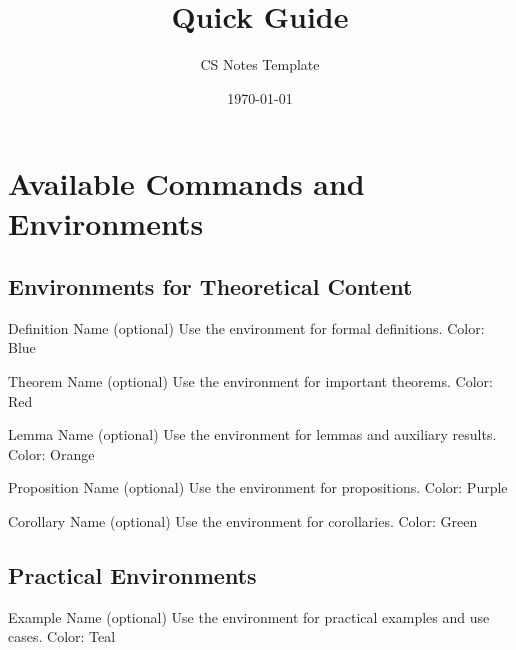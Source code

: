 \documentclass[]{csnotes}
\title{Quick Guide}
\author{CS Notes Template}
\date{\today}
\begin{document}
\maketitlepage{}
\tableofcontents
\listoftheorems
\listofexamples
\listofalgos

\newpage


\section{Available Commands and Environments}

\subsection{Environments for Theoretical Content}\label{sec:theoretical_environments}

\begin{definition}{Definition Name (optional)}
Use the  environment for formal definitions.
Color: Blue
\end{definition}

\begin{theorem}{Theorem Name (optional)}
Use the  environment for important theorems.
Color: Red
\end{theorem}

\begin{lemma}{Lemma Name (optional)}
Use the  environment for lemmas and auxiliary results.
Color: Orange
\end{lemma}

\begin{proposition}{Proposition Name (optional)}
Use the  environment for propositions.
Color: Purple
\end{proposition}

\begin{corollary}{Corollary Name (optional)}
Use the  environment for corollaries.
Color: Green
\end{corollary}

\subsection{Practical Environments}\label{sec:practical_environments}

\begin{example}{Example Name (optional)}
Use the  environment for practical examples and use cases.
Color: Teal
\end{example}
\end{document}
